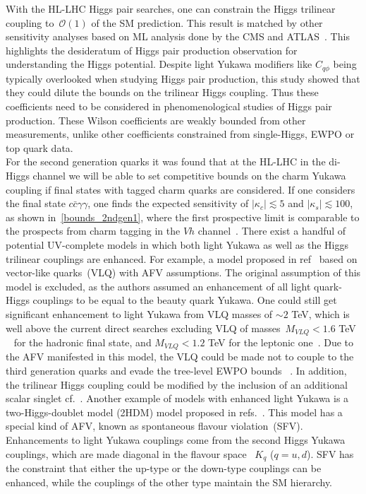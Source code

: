 With the HL-LHC Higgs pair searches, one can constrain the Higgs trilinear coupling to~$\mathcal{O}(1)$ of the SM prediction. This result is matched by other sensitivity analyses based on ML analysis done by the CMS and ATLAS~\cite{ATL-PHYS-PUB-2018-053,ATLAS:2018rvj,CMS-PAS-FTR-18-011}. This highlights the desideratum of Higgs pair production observation for understanding the Higgs potential. Despite light Yukawa modifiers like $C_{q\phi}$ being typically overlooked when studying Higgs pair production, this study showed that they could dilute the bounds on the trilinear Higgs coupling. Thus these coefficients need to be considered in phenomenological studies of Higgs pair production. These Wilson coefficients are weakly bounded from other measurements, unlike other coefficients constrained from single-Higgs, EWPO or top quark data. \\
For the second generation quarks it was found that at the HL-LHC in the di-Higgs channel we will be able to set competitive bounds on the
charm Yukawa coupling if final states with tagged charm quarks are considered.
If one considers the final state $c\bar{c}\gamma\gamma$, one finds the expected sensitivity of $|\kappa_c| \lesssim 5$ and $|\kappa_s | \lesssim 100 $, as shown in~\autoref{bounds_2ndgen1}, where the first prospective limit is comparable to the prospects from charm tagging in the $Vh$ channel~\cite{Perez:2015lra}.
There exist a handful of potential UV-complete models in which both light Yukawa as well as the Higgs trilinear couplings are enhanced. For example, a model proposed in ref~\cite{Bar-Shalom:2018rjs} based on vector-like quarks~(VLQ) with AFV assumptions. The original assumption of this model is excluded, as the authors assumed an enhancement of all light quark-Higgs couplings to be equal to the beauty quark Yukawa. One could still get significant enhancement to light Yukawa from VLQ masses of $ \sim 2$ TeV, which is well above the current direct searches excluding VLQ of masses~$ M_{VLQ} < 1.6$ TeV ~\cite{Unal:2777832,CMS:2019eqb} for the hadronic final state, and $M_{VLQ}< 1.2$ TeV for the leptonic one~\cite{CMS:2018wpl}. Due to the AFV manifested in this model, the VLQ could be made not to couple to the third generation quarks and evade the tree-level EWPO bounds ~\cite{Dawson:2020oco}. In addition, the trilinear Higgs coupling could be modified by the inclusion of an additional scalar singlet cf.~\cite{DiLuzio:2017tfn, Falkowski:2019tft, Chang:2019vez}.  Another example of models with enhanced light Yukawa is a two-Higgs-doublet model (2HDM) model proposed in refs.~\cite{Egana-Ugrinovic:2019dqu,Egana-Ugrinovic:2021uew}. This model has a special kind of AFV, known as spontaneous flavour violation~(SFV).  Enhancements to light Yukawa couplings come from the second Higgs Yukawa couplings, which are made diagonal in the flavour space ~$K_{q}$ ($q=u,d$). SFV has the constraint that either the up-type or the down-type couplings can be enhanced, while the couplings of the other type maintain the SM hierarchy. 
